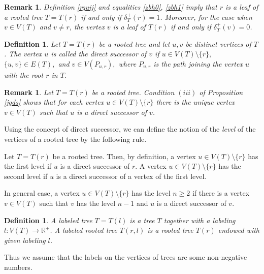 \documentclass[pdflatex,sn-mathphys-num]{sn-jnl}%
\theoremstyle{thmstyleone}%
\theoremstyle{thmstyletwo}%
\newtheorem{Remark}[Theorem]{Remark}
\theoremstyle{thmstylethree}%
\newtheorem{Definition}[Theorem]{Definition}
\theoremstyle{thmstyletwo}%
\theoremstyle{thmstylethree}%
\begin{document}
\begin{Remark}
    \label{efgyh}
Definition \ref{rguij} and equalities \eqref{zbh0}, \eqref{zbh1} imply that $r$ is a leaf of a rooted tree $T=T(r)$ if and only if $\delta_T^{+}(r)= 1$. Moreover, for the case when $v \in V(T)$ and $v \neq r$, the vertex $v$ is a leaf of $T(r)$ if and only if 
$\delta_T^{+}(v)=0$.
\end{Remark} 



\begin{Definition}\label{saqh}
Let $T=T(r)$ be a rooted tree and let $u,v$ be distinct vertices of $T$. 
The vertex $u$ is called the {\it direct successor} of $v$ if
\(
u \in V(T)\setminus\{r\},\) \( \{u,v\}\in E(T),
\)
and
\(
v \in V(P_{u,r}),
\)
where $P_{u,r}$ is the path joining the vertex $u$ with the root $r$ in $T$.
\end{Definition}


\begin{Remark}\label{mnbffss} Let $T=T(r)$ be a rooted tree. Condition $(iii)$ of Proposition \ref{jgds} shows that for each vertex $u\in V(T)\setminus\{r\}$ there is the unique vertex $v\in V(T)$ such that $u$ is a direct successor of $v$.
\end{Remark}






Using the concept of direct successor, we can define the notion of the {\it level} of the vertices of a rooted tree by the following rule.

Let $T =T(r)$ be a rooted tree. Then, by definition, a vertex $u\in V(T)\setminus\{r\}$ has the first level if $u$ is a direct successor of $r$. A vertex $u \in V(T)\setminus\{r\}$ has the second level if $u$ is a direct successor of a vertex of the first level.

In general case, a vertex $u \in V(T)\setminus\{r\}$ has the level $n \geq 2$ if there is a vertex $v \in V(T)$ such that $v$ has the level $n-1$ and $u$ is a direct successor of $v$.

\begin{Definition} \label{outff} A {\it labeled tree} $T=T(l)$ is a tree $T$ together with a labeling $l:V(T)\to \mathbb{R}^{+}$. A {\it labeled rooted tree} $T(r,l)$  is a rooted tree $T(r)$ endowed with given labeling $l$.
\end{Definition}

Thus we assume that the labels on the vertices of trees are some non-negative numbers.
\end{document}
